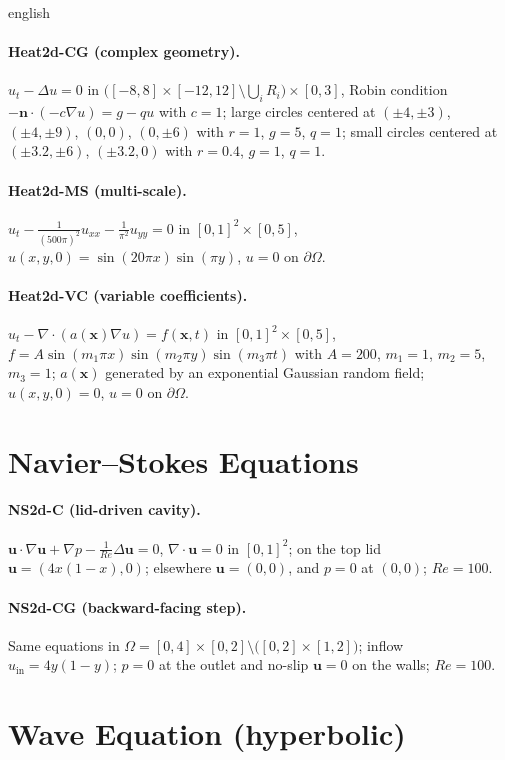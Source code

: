 \documentclass[11pt,letterpaper,twoside,openright]{book} %
\begin{document}
\begin{hyphenrules}{english}
\paragraph{Heat2d-CG (complex geometry).} $u_t-\Delta u=0$ in
$\big([-8,8]\times[-12,12]\setminus\bigcup_iR_i\big)\times[0,3]$, Robin condition
$-\mathbf{n}\cdot(-c\nabla u)=g-qu$ with $c=1$; large circles centered at $(\pm4,\pm3)$, $(\pm4,\pm9)$, $(0,0)$,
$(0,\pm6)$ with $r=1$, $g=5$, $q=1$; small circles centered at $(\pm3.2,\pm6)$, $(\pm3.2,0)$ with $r=0.4$,
$g=1$, $q=1$.

\paragraph{Heat2d-MS (multi-scale).} $u_t-\frac{1}{(500\pi)^2}u_{xx}-\frac{1}{\pi^2}u_{yy}=0$ in
$[0,1]^2\times[0,5]$, $u(x,y,0)=\sin(20\pi x)\sin(\pi y)$, $u=0$ on $\partial\Omega$.

\paragraph{Heat2d-VC (variable coefficients).} $u_t-\nabla\cdot(a(\mathbf{x})\nabla u)=f(\mathbf{x},t)$ in
$[0,1]^2\times[0,5]$, $f=A\sin(m_1\pi x)\sin(m_2\pi y)\sin(m_3\pi t)$ with $A=200$, $m_1=1$, $m_2=5$,
$m_3=1$; $a(\mathbf{x})$ generated by an exponential Gaussian random field; $u(x,y,0)=0$, $u=0$ on $\partial\Omega$.

\section{Navier--Stokes Equations}
\paragraph{NS2d-C (lid-driven cavity).} $\mathbf{u}\cdot\nabla\mathbf{u}+\nabla p-\frac{1}{Re}\Delta\mathbf{u}=0$,
$\nabla\cdot\mathbf{u}=0$ in $[0,1]^2$; on the top lid $\mathbf{u}=(4x(1-x),0)$; elsewhere $\mathbf{u}=(0,0)$,
and $p=0$ at $(0,0)$; $Re=100$.

\paragraph{NS2d-CG (backward-facing step).} Same equations in
$\Omega=[0,4]\times[0,2]\setminus\big([0,2]\times[1,2]\big)$; inflow $u_{\mathrm{in}}=4y(1-y)$; $p=0$ at the
outlet and no-slip $\mathbf{u}=0$ on the walls; $Re=100$.

\section{Wave Equation (hyperbolic)}

\end{hyphenrules}
\end{document}
